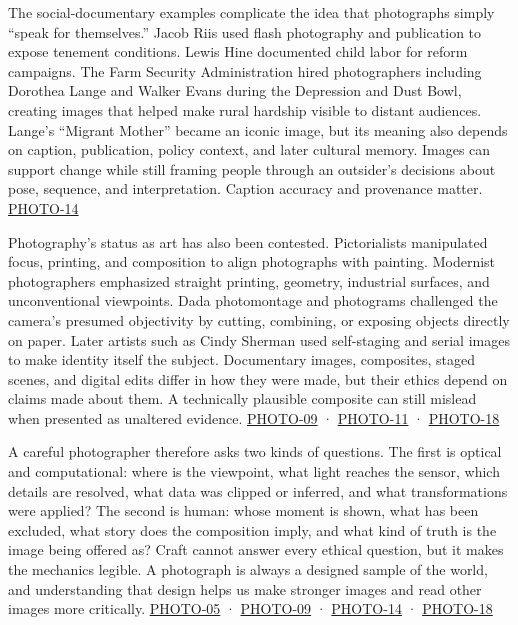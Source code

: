 The social-documentary examples complicate the idea that photographs simply ``speak for themselves.'' Jacob Riis used flash photography and publication to expose tenement conditions. Lewis Hine documented child labor for reform campaigns. The Farm Security Administration hired photographers including Dorothea Lange and Walker Evans during the Depression and Dust Bowl, creating images that helped make rural hardship visible to distant audiences. Lange's ``Migrant Mother'' became an iconic image, but its meaning also depends on caption, publication, policy context, and later cultural memory. Images can support change while still framing people through an outsider's decisions about pose, sequence, and interpretation. Caption accuracy and provenance matter. \hyperref[04-visual-computing-ii-ch036-photo-14---photography-session-14]{PHOTO-14}

Photography's status as art has also been contested. Pictorialists manipulated focus, printing, and composition to align photographs with painting. Modernist photographers emphasized straight printing, geometry, industrial surfaces, and unconventional viewpoints. Dada photomontage and photograms challenged the camera's presumed objectivity by cutting, combining, or exposing objects directly on paper. Later artists such as Cindy Sherman used self-staging and serial images to make identity itself the subject. Documentary images, composites, staged scenes, and digital edits differ in how they were made, but their ethics depend on claims made about them. A technically plausible composite can still mislead when presented as unaltered evidence. \hyperref[04-visual-computing-ii-ch036-photo-09---photography-session-09]{PHOTO-09} · \hyperref[04-visual-computing-ii-ch036-photo-11---photography-session-11]{PHOTO-11} · \hyperref[04-visual-computing-ii-ch036-photo-18---photography-session-18]{PHOTO-18}

A careful photographer therefore asks two kinds of questions. The first is optical and computational: where is the viewpoint, what light reaches the sensor, which details are resolved, what data was clipped or inferred, and what transformations were applied? The second is human: whose moment is shown, what has been excluded, what story does the composition imply, and what kind of truth is the image being offered as? Craft cannot answer every ethical question, but it makes the mechanics legible. A photograph is always a designed sample of the world, and understanding that design helps us make stronger images and read other images more critically. \hyperref[04-visual-computing-ii-ch036-photo-05---photography-session-05]{PHOTO-05} · \hyperref[04-visual-computing-ii-ch036-photo-09---photography-session-09]{PHOTO-09} · \hyperref[04-visual-computing-ii-ch036-photo-14---photography-session-14]{PHOTO-14} · \hyperref[04-visual-computing-ii-ch036-photo-18---photography-session-18]{PHOTO-18}

